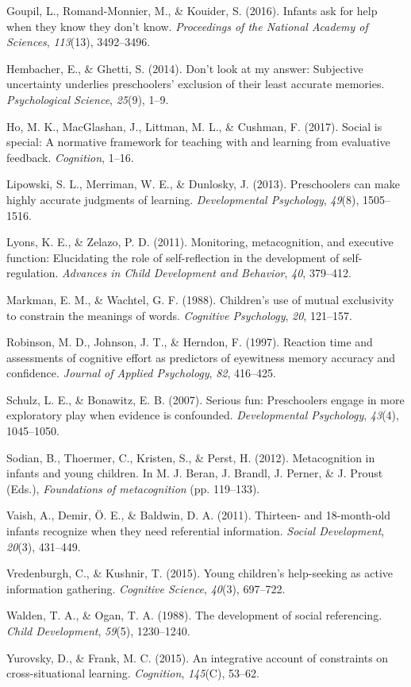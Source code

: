 \documentclass[10pt, letterpaper]{article}
\begin{document}
\hypertarget{ref-Goupil2016}{}
Goupil, L., Romand-Monnier, M., \& Kouider, S. (2016). Infants ask for
help when they know they don't know. \emph{Proceedings of the National
Academy of Sciences}, \emph{113}(13), 3492--3496.

\hypertarget{ref-Hembacher2014}{}
Hembacher, E., \& Ghetti, S. (2014). Don't look at my answer: Subjective
uncertainty underlies preschoolers' exclusion of their least accurate
memories. \emph{Psychological Science}, \emph{25}(9), 1--9.

\hypertarget{ref-Ho2017}{}
Ho, M. K., MacGlashan, J., Littman, M. L., \& Cushman, F. (2017). Social
is special: A normative framework for teaching with and learning from
evaluative feedback. \emph{Cognition}, 1--16.

\hypertarget{ref-Lipowski2013}{}
Lipowski, S. L., Merriman, W. E., \& Dunlosky, J. (2013). Preschoolers
can make highly accurate judgments of learning. \emph{Developmental
Psychology}, \emph{49}(8), 1505--1516.

\hypertarget{ref-Lyons2011}{}
Lyons, K. E., \& Zelazo, P. D. (2011). Monitoring, metacognition, and
executive function: Elucidating the role of self-reflection in the
development of self-regulation. \emph{Advances in Child Development and
Behavior}, \emph{40}, 379--412.

\hypertarget{ref-Markman1988}{}
Markman, E. M., \& Wachtel, G. F. (1988). Children's use of mutual
exclusivity to constrain the meanings of words. \emph{Cognitive
Psychology}, \emph{20}, 121--157.

\hypertarget{ref-Robinson1997}{}
Robinson, M. D., Johnson, J. T., \& Herndon, F. (1997). Reaction time
and assessments of cognitive effort as predictors of eyewitness memory
accuracy and confidence. \emph{Journal of Applied Psychology},
\emph{82}, 416--425.

\hypertarget{ref-Schulz2007}{}
Schulz, L. E., \& Bonawitz, E. B. (2007). Serious fun: Preschoolers
engage in more exploratory play when evidence is confounded.
\emph{Developmental Psychology}, \emph{43}(4), 1045--1050.

\hypertarget{ref-Sodian2012}{}
Sodian, B., Thoermer, C., Kristen, S., \& Perst, H. (2012).
Metacognition in infants and young children. In M. J. Beran, J. Brandl,
J. Perner, \& J. Proust (Eds.), \emph{Foundations of metacognition} (pp.
119--133).

\hypertarget{ref-Vaish2011}{}
Vaish, A., Demir, Ö. E., \& Baldwin, D. A. (2011). Thirteen- and
18-month-old infants recognize when they need referential information.
\emph{Social Development}, \emph{20}(3), 431--449.

\hypertarget{ref-Vredenburgh2015}{}
Vredenburgh, C., \& Kushnir, T. (2015). Young children's help-seeking as
active information gathering. \emph{Cognitive Science}, \emph{40}(3),
697--722.

\hypertarget{ref-Walden1988}{}
Walden, T. A., \& Ogan, T. A. (1988). The development of social
referencing. \emph{Child Development}, \emph{59}(5), 1230--1240.

\hypertarget{ref-Yurovsky2015}{}
Yurovsky, D., \& Frank, M. C. (2015). An integrative account of
constraints on cross-situational learning. \emph{Cognition},
\emph{145}(C), 53--62.
\end{document}
